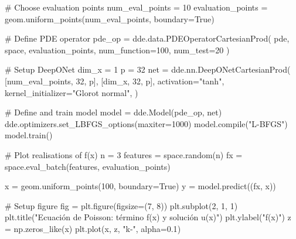 \documentclass[
  spanish,
  us-letterpaper,
  DIV=11,
  numbers=noendperiod]{scrreprt}
\newenvironment{Shaded}{\begin{snugshade}}{\end{snugshade}}
\newcommand{\BuiltInTok}[1]{\textcolor[rgb]{0.00,0.23,0.31}{#1}}
\newcommand{\CommentTok}[1]{\textcolor[rgb]{0.37,0.37,0.37}{#1}}
\newcommand{\DecValTok}[1]{\textcolor[rgb]{0.68,0.00,0.00}{#1}}
\newcommand{\FloatTok}[1]{\textcolor[rgb]{0.68,0.00,0.00}{#1}}
\newcommand{\NormalTok}[1]{\textcolor[rgb]{0.00,0.23,0.31}{#1}}
\newcommand{\OperatorTok}[1]{\textcolor[rgb]{0.37,0.37,0.37}{#1}}
\newcommand{\StringTok}[1]{\textcolor[rgb]{0.13,0.47,0.30}{#1}}
\newcommand{\VariableTok}[1]{\textcolor[rgb]{0.07,0.07,0.07}{#1}}
\theoremstyle{definition}
\theoremstyle{plain}
\theoremstyle{remark}
\begin{document}
\begin{Shaded}
\begin{Highlighting}[]
\CommentTok{\# Choose evaluation points}
\NormalTok{num\_eval\_points }\OperatorTok{=} \DecValTok{10}
\NormalTok{evaluation\_points }\OperatorTok{=}\NormalTok{ geom.uniform\_points(num\_eval\_points, boundary}\OperatorTok{=}\VariableTok{True}\NormalTok{)}

\CommentTok{\# Define PDE operator}
\NormalTok{pde\_op }\OperatorTok{=}\NormalTok{ dde.data.PDEOperatorCartesianProd(}
\NormalTok{    pde,}
\NormalTok{    space,}
\NormalTok{    evaluation\_points,}
\NormalTok{    num\_function}\OperatorTok{=}\DecValTok{100}\NormalTok{,}
\NormalTok{    num\_test}\OperatorTok{=}\DecValTok{20}
\NormalTok{)}

\CommentTok{\# Setup DeepONet}
\NormalTok{dim\_x }\OperatorTok{=} \DecValTok{1}
\NormalTok{p }\OperatorTok{=} \DecValTok{32}
\NormalTok{net }\OperatorTok{=}\NormalTok{ dde.nn.DeepONetCartesianProd(}
\NormalTok{    [num\_eval\_points, }\DecValTok{32}\NormalTok{, p],}
\NormalTok{    [dim\_x, }\DecValTok{32}\NormalTok{, p],}
\NormalTok{    activation}\OperatorTok{=}\StringTok{"tanh"}\NormalTok{,}
\NormalTok{    kernel\_initializer}\OperatorTok{=}\StringTok{"Glorot normal"}\NormalTok{,}
\NormalTok{)}

\CommentTok{\# Define and train model}
\NormalTok{model }\OperatorTok{=}\NormalTok{ dde.Model(pde\_op, net)}
\NormalTok{dde.optimizers.set\_LBFGS\_options(maxiter}\OperatorTok{=}\DecValTok{1000}\NormalTok{)}
\NormalTok{model.}\BuiltInTok{compile}\NormalTok{(}\StringTok{"L{-}BFGS"}\NormalTok{)}
\NormalTok{model.train()}

\CommentTok{\# Plot realisations of f(x)}
\NormalTok{n }\OperatorTok{=} \DecValTok{3}
\NormalTok{features }\OperatorTok{=}\NormalTok{ space.random(n)}
\NormalTok{fx }\OperatorTok{=}\NormalTok{ space.eval\_batch(features, evaluation\_points)}

\NormalTok{x }\OperatorTok{=}\NormalTok{ geom.uniform\_points(}\DecValTok{100}\NormalTok{, boundary}\OperatorTok{=}\VariableTok{True}\NormalTok{)}
\NormalTok{y }\OperatorTok{=}\NormalTok{ model.predict((fx, x))}

\CommentTok{\# Setup figure}
\NormalTok{fig }\OperatorTok{=}\NormalTok{ plt.figure(figsize}\OperatorTok{=}\NormalTok{(}\DecValTok{7}\NormalTok{, }\DecValTok{8}\NormalTok{))}
\NormalTok{plt.subplot(}\DecValTok{2}\NormalTok{, }\DecValTok{1}\NormalTok{, }\DecValTok{1}\NormalTok{)}
\NormalTok{plt.title(}\StringTok{"Ecuación de Poisson: término f(x) y solución u(x)"}\NormalTok{)}
\NormalTok{plt.ylabel(}\StringTok{"f(x)"}\NormalTok{)}
\NormalTok{z }\OperatorTok{=}\NormalTok{ np.zeros\_like(x)}
\NormalTok{plt.plot(x, z, }\StringTok{"k{-}"}\NormalTok{, alpha}\OperatorTok{=}\FloatTok{0.1}\NormalTok{)}


\end{Highlighting}
\end{Shaded}
\end{document}
